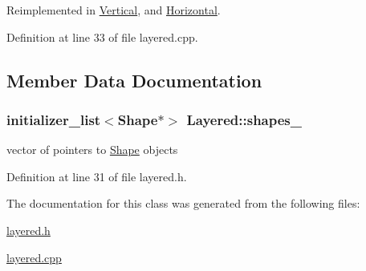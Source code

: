 Reimplemented in \hyperlink{class_vertical_a9be329f986230ccaa35ec7f63553d658}{Vertical}, and \hyperlink{class_horizontal_aea100857d1a9a269b66060b8bd32ced1}{Horizontal}.



Definition at line 33 of file layered.\+cpp.



\subsection{Member Data Documentation}
\hypertarget{class_layered_a80ab4f9aaec1246a9d16400bbf8d3dce}{}
\subsubsection[{shapes\+\_\+}]{\setlength{\rightskip}{0pt plus 5cm}initializer\+\_\+list$<${\bf Shape}$\ast$$>$ Layered\+::shapes\+\_\+\hspace{0.3cm}{\ttfamily [protected]}}\label{class_layered_a80ab4f9aaec1246a9d16400bbf8d3dce}
vector of pointers to \hyperlink{class_shape}{Shape} objects 

Definition at line 31 of file layered.\+h.



The documentation for this class was generated from the following files\+:\begin{DoxyCompactItemize}
\item 
\hyperlink{layered_8h}{layered.\+h}\item 
\hyperlink{layered_8cpp}{layered.\+cpp}\end{DoxyCompactItemize}
